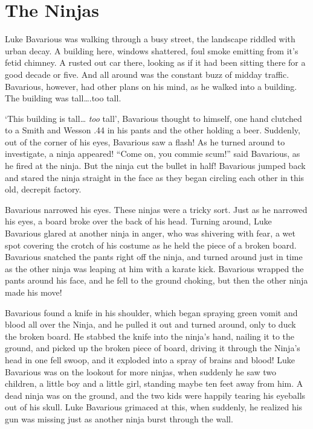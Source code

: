 \chapter{The Ninjas}





Luke Bavarious was walking through a busy street, the landscape
riddled with urban decay. A building here, windows shattered, foul
smoke emitting from it's fetid chimney. A rusted out car
there, looking as if it had been sitting there for a good decade or
five. And all around was the constant buzz of midday traffic.
Bavarious, however, had other plans on his mind, as he walked into
a building. The building was tall{\ldots}.too tall.



`This building is tall{\ldots} {\em too} tall', Bavarious
thought to himself, one hand clutched to a Smith and Wesson .44 in
his pants and the other holding a beer. Suddenly, out of the corner
of his eyes, Bavarious saw a flash! As he turned around to
investigate, a ninja appeared! ``Come on, you commie
scum!'' said Bavarious, as he fired at the ninja. But the
ninja cut the bullet in half! Bavarious jumped back and stared the
ninja straight in the face as they began circling each other in
this old, decrepit factory.



Bavarious narrowed his eyes. These ninjas were a tricky sort. Just
as he narrowed his eyes, a board broke over the back of his head.
Turning around, Luke Bavarious glared at another ninja in anger,
who was shivering with fear, a wet spot covering the crotch of his
costume as he held the piece of a broken board. Bavarious snatched
the pants right off the ninja, and turned around just in time as
the other ninja was leaping at him with a karate kick. Bavarious
wrapped the pants around his face, and he fell to the ground
choking, but then the other ninja made his move!



Bavarious found a knife in his shoulder, which began spraying green
vomit and blood all over the Ninja, and he pulled it out and turned
around, only to duck the broken board. He stabbed the knife into
the ninja's hand, nailing it to the ground, and picked up the
broken piece of board, driving it through the Ninja's head in
one fell swoop, and it exploded into a spray of brains and blood!
Luke Bavarious was on the lookout for more ninjas, when suddenly he
saw two children, a little boy and a little girl, standing maybe
ten feet away from him. A dead ninja was on the ground, and the two
kids were happily tearing his eyeballs out of his skull. Luke
Bavarious grimaced at this, when suddenly, he realized his gun was
missing just as another ninja burst through the wall.



